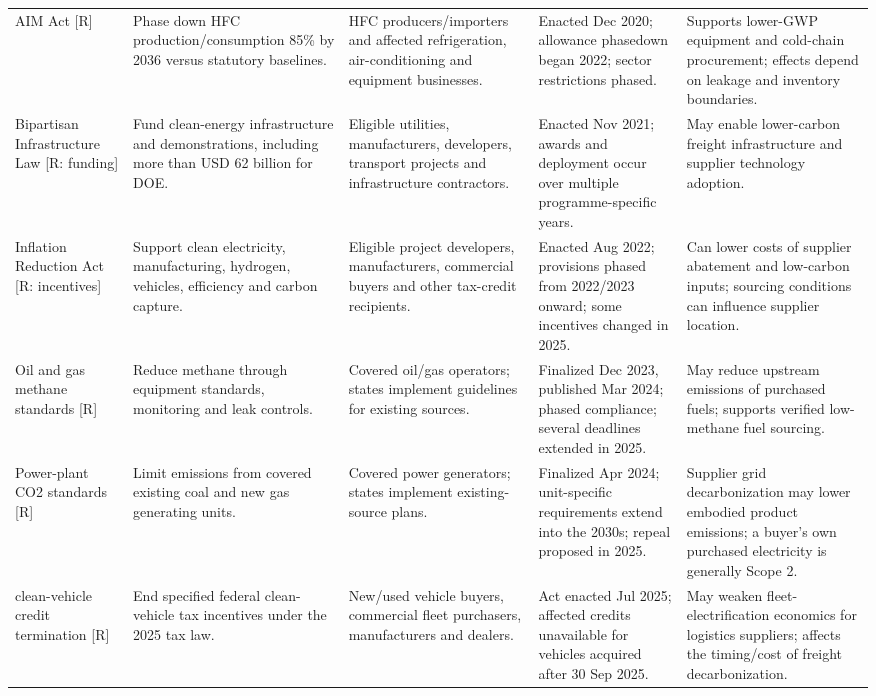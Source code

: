 \documentclass[10pt,a4paper,landscape]{article}
\begin{document}
\begin{tabularx}{\textwidth}{Y{0.85}Y{1.00}Y{0.85}Y{1.05}Y{1.25}}
\addlinespace[5pt]
AIM Act [R]\cite{aim} & Phase down HFC production/consumption 85\% by 2036 versus statutory baselines. & HFC producers/importers and affected refrigeration, air-conditioning and equipment businesses. & Enacted Dec 2020; allowance phasedown began 2022; sector restrictions phased. & Supports lower-GWP equipment and cold-chain procurement; effects depend on leakage and inventory boundaries. \\
\addlinespace[5pt]
Bipartisan Infrastructure Law [R: funding]\cite{bil} & Fund clean-energy infrastructure and demonstrations, including more than USD 62 billion for DOE. & Eligible utilities, manufacturers, developers, transport projects and infrastructure contractors. & Enacted Nov 2021; awards and deployment occur over multiple programme-specific years. & May enable lower-carbon freight infrastructure and supplier technology adoption. \\
\addlinespace[5pt]
Inflation Reduction Act [R: incentives]\cite{ira,ev2025} & Support clean electricity, manufacturing, hydrogen, vehicles, efficiency and carbon capture. & Eligible project developers, manufacturers, commercial buyers and other tax-credit recipients. & Enacted Aug 2022; provisions phased from 2022/2023 onward; some incentives changed in 2025. & Can lower costs of supplier abatement and low-carbon inputs; sourcing conditions can influence supplier location. \\
\addlinespace[5pt]
Oil and gas methane standards [R]\cite{methane2023,methanedelay} & Reduce methane through equipment standards, monitoring and leak controls. & Covered oil/gas operators; states implement guidelines for existing sources. & Finalized Dec 2023, published Mar 2024; phased compliance; several deadlines extended in 2025. & May reduce upstream emissions of purchased fuels; supports verified low-methane fuel sourcing. \\
\addlinespace[5pt]
Power-plant CO2 standards [R]\cite{power2024,powerrepeal} & Limit emissions from covered existing coal and new gas generating units. & Covered power generators; states implement existing-source plans. & Finalized Apr 2024; unit-specific requirements extend into the 2030s; repeal proposed in 2025. & Supplier grid decarbonization may lower embodied product emissions; a buyer's own purchased electricity is generally Scope 2. \\
 clean-vehicle credit termination [R]\cite{ev2025} & End specified federal clean-vehicle tax incentives under the 2025 tax law. & New/used vehicle buyers, commercial fleet purchasers, manufacturers and dealers. & Act enacted Jul 2025; affected credits unavailable for vehicles acquired after 30 Sep 2025. & May weaken fleet-electrification economics for logistics suppliers; affects the timing/cost of freight decarbonization. \\

\end{tabularx}
\end{document}
